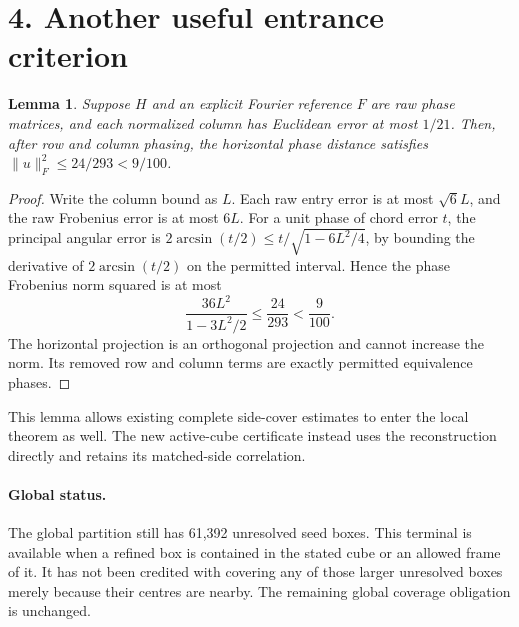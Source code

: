 \documentclass[11pt]{article}
\newtheorem{lemma}{Lemma}
\begin{document}
\section*{4. Another useful entrance criterion}
\begin{lemma}
Suppose $H$ and an explicit Fourier reference $F$ are raw phase
matrices, and each normalized column has Euclidean error at most
$1/21$. Then, after row and column phasing, the horizontal phase
distance satisfies
$\|u\|_F^2\le24/293<9/100$.
\end{lemma}
\begin{proof}
Write the column bound as $L$. Each raw entry error is at most
$\sqrt6L$, and the raw Frobenius error is at most $6L$. For a unit
phase of chord error $t$, the principal angular error is
$2\arcsin(t/2)\le t/\sqrt{1-6L^2/4}$, by bounding the derivative
of $2\arcsin(t/2)$ on the permitted interval. Hence the phase
Frobenius norm squared is at most
\[
 \frac{36L^2}{1-3L^2/2}\le\frac{24}{293}<\frac9{100}.
\]
The horizontal projection is an orthogonal projection and cannot
increase the norm. Its removed row and column terms are exactly
permitted equivalence phases.
\end{proof}

This lemma allows existing complete side-cover estimates to enter
the local theorem as well. The new active-cube certificate instead
uses the reconstruction directly and retains its matched-side
correlation.

\paragraph{Global status.}
The global partition still has 61,392 unresolved seed boxes. This
terminal is available when a refined box is contained in the stated
cube or an allowed frame of it. It has not been credited with covering
any of those larger unresolved boxes merely because their centres
are nearby. The remaining global coverage obligation is unchanged.
\end{document}
